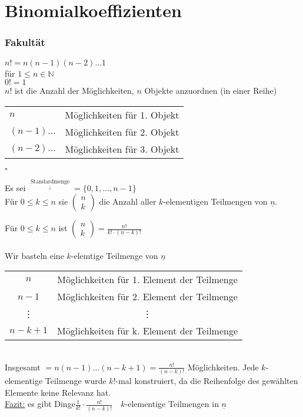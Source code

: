 \section{Binomialkoeffizienten}

%
%
%

\subsubsection{Fakultät}
$n! = n(n-1)(n-2)\dots1$\\
für $1\leq n\in\mathbb{N}$\\
$0!=1$\\

%
%
%

\stz
$n!$ ist die Anzahl der Möglichkeiten, $n$ Objekte anzuordnen (in einer Reihe)\\

%
%
%

\bws 

 \begin{tabular}{ll}
$n$  & Möglichkeiten für 1. Objekt \\
$(n-1)\dots$ & Möglichkeiten für 2. Objekt \\
$(n-2)\dots$ & Möglichkeiten für 3. Objekt\\
 \end{tabular}$\square$

%
%
%

Es sei $\mathop{\underline{n}}\limits^{\mathop{\textrm{Standardmenge}}\limits_{\downarrow}} = \{0,1,\dots,n-1\}$\\ 
Für $0\leq k \leq n$ sie $\begin{pmatrix} n \\ k \end{pmatrix}$ die Anzahl  aller $k$-elementigen Teilmengen von $\underline{n}$. 

%
%
%

\stz
Für $0\leq k \leq n$ ist $\begin{pmatrix} n \\ k \end{pmatrix} = \frac{n!}{k! \cdot (n-k)!} $ \\
\bws \\
Wir basteln eine $k$-elemtige Teilmenge von $\underline{n}$ \\
\begin{tabular}{cc}
$n$ & Möglichkeiten für 1. Element der Teilmenge \\
$n-1$ & Möglichkeiten für 2. Element der Teilmenge  \\
 \vdots &  \vdots  \\
$n-k+1$ & Möglichkeiten für k. Element der Teilmenge \\
\end{tabular}
\\
Insgesamt $= n(n-1) \dotsc (n-k+1)=\frac{n!}{(n-k)!}$ Möglichkeiten. Jede $k$-elementige Teilmenge wurde $k!$-mal konstruiert, da die Reihenfolge des gewählten Elemente keine Relevanz hat.\\
\underline{Fazit:} es gibt Dinge$\frac{1}{k!} \cdot \frac{n!}{(n-k)!} \quad k$-elementige Teilmengen in $\underline{n}$

